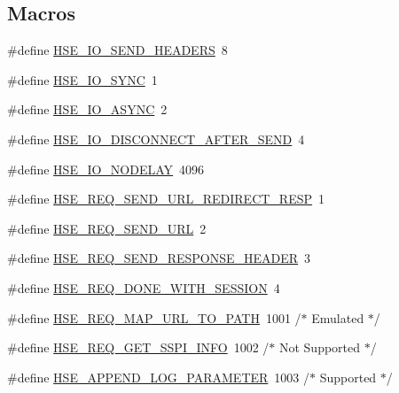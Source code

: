 \subsection*{Macros}
\begin{DoxyCompactItemize}
\item 
\#define \hyperlink{group__MOD__ISAPI_ga4eb3ab330c3da69f97a75a76b8f20b72}{H\+S\+E\+\_\+\+I\+O\+\_\+\+S\+E\+N\+D\+\_\+\+H\+E\+A\+D\+E\+RS}~8
\item 
\#define \hyperlink{group__MOD__ISAPI_ga88f20418b366fb805f0a19ba2c23ea14}{H\+S\+E\+\_\+\+I\+O\+\_\+\+S\+Y\+NC}~1
\item 
\#define \hyperlink{group__MOD__ISAPI_ga974d08c1d58406cfe2de5bceb826d246}{H\+S\+E\+\_\+\+I\+O\+\_\+\+A\+S\+Y\+NC}~2
\item 
\#define \hyperlink{group__MOD__ISAPI_ga70d5744ddaea8d57ec84c78f6fbce9a2}{H\+S\+E\+\_\+\+I\+O\+\_\+\+D\+I\+S\+C\+O\+N\+N\+E\+C\+T\+\_\+\+A\+F\+T\+E\+R\+\_\+\+S\+E\+ND}~4
\item 
\#define \hyperlink{group__MOD__ISAPI_ga84df1a5e2e1cca5f67c26cc4cc6baa8f}{H\+S\+E\+\_\+\+I\+O\+\_\+\+N\+O\+D\+E\+L\+AY}~4096
\item 
\#define \hyperlink{group__MOD__ISAPI_ga8bd0b1ca69489c3d7e93c144a25c5f32}{H\+S\+E\+\_\+\+R\+E\+Q\+\_\+\+S\+E\+N\+D\+\_\+\+U\+R\+L\+\_\+\+R\+E\+D\+I\+R\+E\+C\+T\+\_\+\+R\+E\+SP}~1
\item 
\#define \hyperlink{group__MOD__ISAPI_ga491815d2cba81c6b570add5ea2fd59a5}{H\+S\+E\+\_\+\+R\+E\+Q\+\_\+\+S\+E\+N\+D\+\_\+\+U\+RL}~2
\item 
\#define \hyperlink{group__MOD__ISAPI_gaa74328fe7c41cc0f9d126723ed1a2c27}{H\+S\+E\+\_\+\+R\+E\+Q\+\_\+\+S\+E\+N\+D\+\_\+\+R\+E\+S\+P\+O\+N\+S\+E\+\_\+\+H\+E\+A\+D\+ER}~3
\item 
\#define \hyperlink{group__MOD__ISAPI_gab0ef3c3235f5768e2c8920f33376c268}{H\+S\+E\+\_\+\+R\+E\+Q\+\_\+\+D\+O\+N\+E\+\_\+\+W\+I\+T\+H\+\_\+\+S\+E\+S\+S\+I\+ON}~4
\item 
\#define \hyperlink{group__MOD__ISAPI_gae0afc26aa195559c37551c7900d7229c}{H\+S\+E\+\_\+\+R\+E\+Q\+\_\+\+M\+A\+P\+\_\+\+U\+R\+L\+\_\+\+T\+O\+\_\+\+P\+A\+TH}~1001 /$\ast$ Emulated $\ast$/
\item 
\#define \hyperlink{group__MOD__ISAPI_gab2ab33ea0d698ebe28f83f5d566b9986}{H\+S\+E\+\_\+\+R\+E\+Q\+\_\+\+G\+E\+T\+\_\+\+S\+S\+P\+I\+\_\+\+I\+N\+FO}~1002 /$\ast$ Not Supported $\ast$/
\item 
\#define \hyperlink{group__MOD__ISAPI_ga19d25e4acbee6bd2d026eecc57e128b1}{H\+S\+E\+\_\+\+A\+P\+P\+E\+N\+D\+\_\+\+L\+O\+G\+\_\+\+P\+A\+R\+A\+M\+E\+T\+ER}~1003 /$\ast$ Supported $\ast$/

\end{DoxyCompactItemize}
